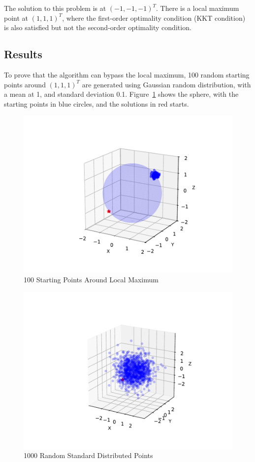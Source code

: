 The solution to this problem is at $(-1,-1,-1)^T$. There is a local maximum point at $(1,1,1)^T$, where the 
first-order optimality condition (KKT condition) is also satisfied but not the second-order optimality condition. 

\subsection{Results}
To prove that the algorithm can bypass the local maximum, 100 random starting points around $(1,1,1)^T$ are generated using Gaussian random distribution, with a mean at 1, and standard deviation 0.1. Figure~\ref{fig:sphere_100} shows the sphere, with the starting points in blue circles, and the solutions in red starts. 

 \begin{figure}[H]
  \centering
  \includegraphics[clip,trim=20 40 20 70, width=1.0\columnwidth]{./figs/chap2/100_111.pdf}%
  \caption{100 Starting Points Around Local Maximum \label{fig:sphere_100}}
\end{figure}


 \begin{figure}[H]
  \centering
  \includegraphics[clip,trim=80 40 20 70, width=1.1\columnwidth]{./figs/chap2/1000.pdf}%
  \caption{1000 Random Standard Distributed Points \label{fig:sphere_1000}}
\end{figure}

